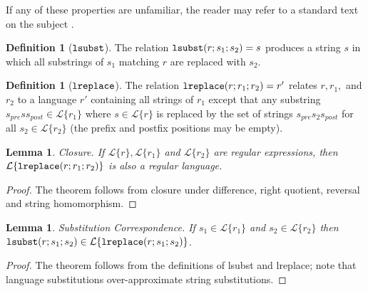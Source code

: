 \documentclass[9pt]{sig-alternate}
\newtheorem{lem}[thm]{Lemma}
\theoremstyle{definition}
\newtheorem{defn}[thm]{Definition}
\newcommand{\Lagr}{\mathcal{L}}
\newcommand{\lang}[1]{\Lagr\{#1\}}
\newcommand{\lsubst}[3]{{\tt lsubst}(#1;#2;#3)} %
\newcommand{\lreplace}[3]{{\tt lreplace}(#1; #2; #3)}
\begin{document}
If any of these properties are unfamiliar, the reader may refer to a standard text on the subject \cite{cinderella}.

\begin{defn}[$\tt{lsubst}$]
The relation $\lsubst{r}{s_1}{s_2} = s$ produces a string $s$ in which all substrings of $s_1$ matching $r$ are replaced with $s_2$.
\end{defn}

\begin{defn}[$\tt{lreplace}$]
  The relation $\lreplace{r}{r_1}{r_2} = r'$ relates $r, r_1,$ and $r_2$ to
  a language $r'$ containing all strings of $r_1$ except that any substring $s_{pre} s s_{post} \in \lang{r_1}$ where $s \in \lang{r}$
  is replaced by the set of strings $s_{pre} s_2 s_{post}$ for all $s_2 \in \lang{r_2}$ (the prefix and postfix positions may be empty).
\end{defn}

\begin{lem}{Closure.} \label{thm:total}
  If $\lang{r}, \lang{r_1}$ and $\lang{r_2}$ are regular expressions, then $\lang{\lreplace{r}{r_1}{r_2}}$ is also a regular language.
\end{lem}
\begin{proof}
The theorem follows from closure under difference, right quotient, reversal and string homomorphism.
\end{proof}

\begin{lem}{Substitution Correspondence.} \label{thm:substcorrespondence}
  If $s_1 \in \lang{r_1}$ and $s_2 \in \lang{r_2}$ then $\lsubst{r}{s_1}{s_2} \in \lang{\lreplace{r}{s_1}{s_2}}$.
\end{lem}
\begin{proof}
The theorem follows from the definitions of lsubst and lreplace; note that language substitutions over-approximate string substitutions.
\end{proof}
\end{document}
